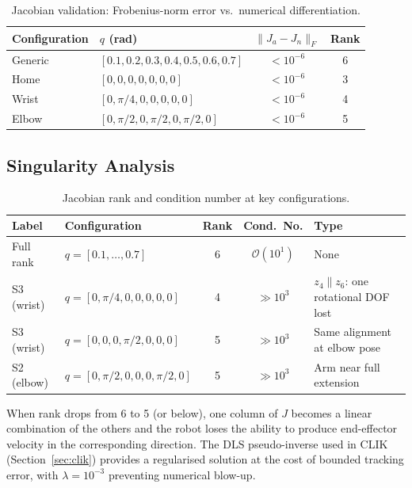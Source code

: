 \documentclass[11pt,a4paper]{article}
\begin{document}
\begin{table}[H]
  \centering
  \caption{Jacobian validation: Frobenius-norm error vs.\ numerical differentiation.}
  \begin{tabular}{llcc}
    \toprule
    Configuration & $q$ (rad) & $\|J_a-J_n\|_F$ & Rank \\
    \midrule
    Generic & $[0.1,0.2,0.3,0.4,0.5,0.6,0.7]$ & $<10^{-6}$ & 6 \\
    Home    & $[0,0,0,0,0,0,0]$                 & $<10^{-6}$ & 3 \\
    Wrist   & $[0,\pi/4,0,0,0,0,0]$             & $<10^{-6}$ & 4 \\
    Elbow   & $[0,\pi/2,0,\pi/2,0,\pi/2,0]$     & $<10^{-6}$ & 5 \\
    \bottomrule
  \end{tabular}
  \label{tab:jac_val}
\end{table}

\subsection{Singularity Analysis}
\begin{table}[H]
  \centering
  \caption{Jacobian rank and condition number at key configurations.}
  \begin{tabular}{llccp{4.5cm}}
    \toprule
    Label & Configuration & Rank & Cond.\ No. & Type \\
    \midrule
    Full rank & $q=[0.1,\ldots,0.7]$ & 6 & $\mathcal{O}(10^1)$ & None \\
    S3 (wrist) & $q=[0,\pi/4,0,0,0,0,0]$   & 4 & $\gg10^3$ & $z_4\!\parallel\!z_6$: one rotational DOF lost \\
    S3 (wrist) & $q=[0,0,0,\pi/2,0,0,0]$  & 5 & $\gg10^3$ & Same alignment at elbow pose \\
    S2 (elbow) & $q=[0,\pi/2,0,0,0,\pi/2,0]$ & 5 & $\gg10^3$ & Arm near full extension \\
    \bottomrule
  \end{tabular}
\end{table}

When rank drops from 6 to 5 (or below), one column of $J$ becomes a linear
combination of the others and the robot loses the ability to produce
end-effector velocity in the corresponding direction. The DLS pseudo-inverse
used in CLIK (Section~\ref{sec:clik}) provides a regularised solution at the
cost of bounded tracking error, with $\lambda=10^{-3}$ preventing numerical
blow-up.
\end{document}
